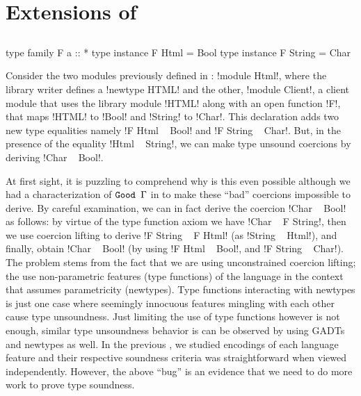 \documentclass[screen,nonacm]{acmart}
\begin{document}
\section{Extensions of \SFC}\label{sec:fc-extensions}%
\subsection{\SFR}\label{sec:sfr} %

\begin{CenteredBox}
  \begin{code}
    type family F a :: *
    type instance F Html = Bool
    type instance F String = Char
  \end{code}
\end{CenteredBox}

Consider the two modules previously defined in : !module Html!, where the library writer defines a !newtype HTML! and the other, !module Client!, a client module that uses the library module !HTML! along with an open function !F!, that maps !HTML! to !Bool! and !String! to !Char!. This declaration adds two new type equalities namely !F Html ~ Bool! and !F String ~ Char!. But, in the presence of the equality !Html ~ String!, we can make type unsound coercions by deriving !Char ~ Bool!.

At first sight, it is puzzling to comprehend why is this even possible although we had a characterization of $\texttt{Good~}\Gamma$ in  to make these ``bad'' coercions impossible to derive. By careful examination, we can in fact derive the coercion !Char ~ Bool! as follows: by virtue of the type function axiom we have !Char ~ F String!, then we use coercion lifting to derive !F String ~ F Html! (as !String ~ Html!), and finally, obtain !Char ~ Bool! (by using !F Html ~ Bool!, and !F String ~ Char!). The problem stems from the fact that we are using unconstrained coercion lifting; the use non-parametric features (type functions) of the language in the context that assumes parametricity (newtypes). Type functions interacting with newtypes is just one case where seemingly innocuous features mingling with each other cause type unsoundness. Just limiting the use of type functions however is not enough, similar type unsoundness behavior is can be observed by using GADTs and newtypes as well\cite{weirich_generative_2011}. In the previous , we studied \SFC encodings of each language feature and their respective soundness criteria was straightforward when viewed independently. However, the above ``bug'' is an evidence that we need to do more work to prove type soundness.
\end{document}
